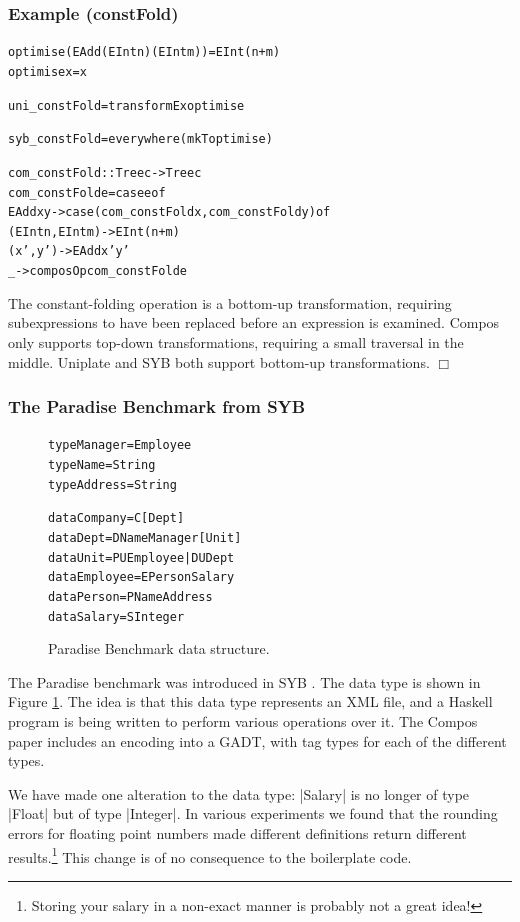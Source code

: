 \documentclass[preprint]{sigplanconf}
\newcounter{exmp}
\newcommand{\noexample}{\hfill$\Box$}
\newenvironment{code}{\begin{alltt}\small}{\end{alltt}}
\newenvironment{examplename}[1]
    {\subsubsection*{Example \arabic{exmp} (#1)}\refstepcounter{exmp}}
    {\noexample}
\newcommand{\ignore}{}
\begin{document}
\begin{examplename}{constFold}

\ignore\begin{code}
optimise (EAdd (EInt n) (EInt m)) = EInt (n+m)
optimise x = x

uni_constFold = transformEx optimise

syb_constFold = everywhere (mkT optimise)

com_constFold :: Tree c -> Tree c
com_constFold e = case e of
    EAdd x y -> case  (com_constFold x, com_constFold y) of
                      (EInt n, EInt m) -> EInt (n+m)
                      (x',y') -> EAdd x' y'
    _ -> composOp com_constFold e
\end{code}

The constant-folding operation is a bottom-up transformation, requiring subexpressions to have been replaced before an expression is examined. Compos only supports top-down transformations, requiring a small traversal in the middle. Uniplate and SYB both support bottom-up transformations.
\end{examplename}

\subsubsection{The Paradise Benchmark from SYB}

\begin{figure}
\begin{code}
type Manager   = Employee
type Name      = String
type Address   = String

data Company   = C [Dept]
data Dept      = D Name Manager [Unit]
data Unit      = PU Employee | DU Dept
data Employee  = E Person Salary
data Person    = P Name Address
data Salary    = S Integer
\end{code}
\caption{Paradise Benchmark data structure.}
\label{fig:paradise}
\end{figure}

The Paradise benchmark was introduced in SYB \citep{lammel:syb}. The data type is shown in Figure \ref{fig:paradise}. The idea is that this data type represents an XML file, and a Haskell program is being written to perform various operations over it. The Compos paper includes an encoding into a GADT, with tag types for each of the different types.

We have made one alteration to the data type: |Salary| is no longer of type |Float| but of type |Integer|. In various experiments we found that the rounding errors for floating point numbers made different definitions return different results.\footnote{Storing your salary in a non-exact manner is probably not a great idea!} This change is of no consequence to the boilerplate code.
\end{document}
